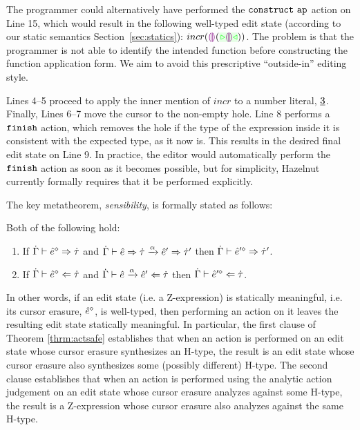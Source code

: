 The programmer could alternatively have performed the $\mathtt{construct}~\mathtt{ap}$
action on Line 15, which would result in the following well-typed edit state (according to our static semantics Section~\ref{sec:statics}):
$incr(\hhole{}(\zwsel{\hhole{}}))$. 
The problem is that the programmer is not able to identify the intended
function before constructing the function application form. We aim to avoid this prescriptive ``outside-in'' editing style.

Lines 4--5 proceed to apply the inner
mention of $incr$ to a number literal, $\underline{3}$. Finally, Lines
6--7 move the cursor to the non-empty hole. Line 8 performs a $\mathtt{finish}$
action, which removes the hole if the type of the
expression inside it is consistent with the expected type, as it now
is. This results in the desired final edit state on Line 9. In
practice, the editor would automatically perform the $\mathtt{finish}$ action as
soon as it becomes possible, but for simplicity, Hazelnut currently formally requires
that it be performed explicitly.

The key 
metatheorem, \emph{sensibility}, is formally stated as follows:%
\begin{theorem}
  \label{thrm:actsafe} Both of the following hold:
  \begin{enumerate}[itemsep=0px,partopsep=0px,topsep=0px]
  \item If $\dot{\Gamma} \vdash \hat{e}^{\diamond} \Rightarrow \dot{\tau}$ and
    $\dot{\Gamma} \vdash \hat{e} \Rightarrow \dot{\tau} \xrightarrow{\alpha} \hat{e}' \Rightarrow \dot{\tau}'$ then
    $\dot{\Gamma} \vdash \hat{e}'^{\diamond} \Rightarrow \dot{\tau}'$.
  \item If $\dot{\Gamma} \vdash \hat{e}^{\diamond} \Leftarrow \dot{\tau}$ and
    $\dot{\Gamma} \vdash \hat{e} \xrightarrow{\alpha} \hat{e}' \Leftarrow \dot{\tau}$ then
    $\dot{\Gamma} \vdash \hat{e}'^{\diamond} \Leftarrow \dot{\tau}$.
  \end{enumerate}
\end{theorem}
\noindent In other words, if an edit state (i.e. a Z-expression) is
statically meaningful, i.e. its cursor erasure, $\hat{e}^{\diamond}$, is well-typed, then
performing an action on it leaves the resulting edit state statically
meaningful. In particular, the first clause of Theorem \ref{thrm:actsafe}
establishes that when an action is performed on an edit state whose cursor
erasure synthesizes an H-type, the result is an edit state whose cursor
erasure also synthesizes some (possibly different) H-type. The second
clause establishes that when an action is performed using the analytic
action judgement on an edit state whose cursor erasure analyzes against
some H-type, the result is a Z-expression whose cursor erasure also
analyzes against the same H-type.


